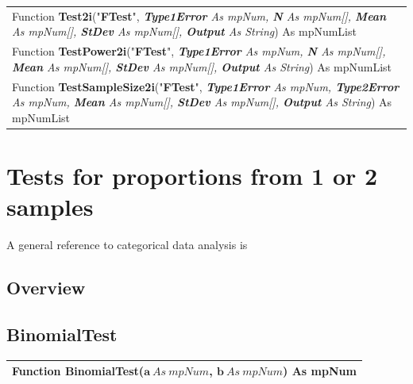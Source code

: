 \begin{tabular}{p{481pt}}
	\toprule
	{\sffamily Function {\bfseries Test2i}("{\bfseries FTest}", {\itshape{\bfseries Type1Error} As mpNum, {\bfseries N} As mpNum[], {\bfseries Mean} As mpNum[], {\bfseries StDev} As mpNum[], {\bfseries Output} As String}) As mpNumList}\index{Multiprecision Functions!TDist} \\[0.2cm]
	
	{\sffamily Function {\bfseries TestPower2i}("{\bfseries FTest}", {\itshape{\bfseries Type1Error} As mpNum, {\bfseries N} As mpNum[], {\bfseries Mean} As mpNum[], {\bfseries StDev} As mpNum[], {\bfseries Output} As String}) As mpNumList}\index{Multiprecision Functions!TDist} \\[0.2cm]
	
	{\sffamily Function {\bfseries TestSampleSize2i}("{\bfseries FTest}", {\itshape{\bfseries Type1Error} As mpNum, {\bfseries Type2Error} As mpNum, {\bfseries Mean} As mpNum[], {\bfseries StDev} As mpNum[], {\bfseries Output} As String}) As mpNumList}\index{Multiprecision Functions!TDist} \\
	\bottomrule
\end{tabular}
\vspace{0.3cm}



\newpage
\section{Tests for proportions from 1 or 2 samples}
\label{1SampleBinomialTest}
A general reference to categorical data analysis is \cite{Agresti_2002}


\subsection{Overview}
\label{1SampleBinomialTestOverview}

\lipsum[2]

\subsection{BinomialTest}
\begin{tabular}{p{481pt}}
	\toprule
	\textsf{Function \textbf{BinomialTest}($\boldsymbol{a}\ As\ mpNum$, $\boldsymbol{b}\ As\ mpNum$) As mpNum}\index{Multiprecision Functions!BinomialTest} \\
	\bottomrule
\end{tabular}

\vspace{0.3cm}


